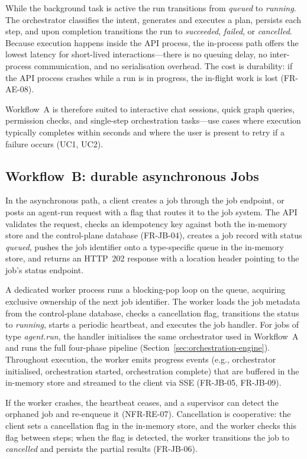 \documentclass[a4paper,noexaminfo]{sapthesis}
\begin{document}
While the background task is active the run transitions from
\emph{queued} to \emph{running}.  The orchestrator classifies the intent,
generates and executes a plan, persists each step, and upon completion
transitions the run to \emph{succeeded}, \emph{failed}, or \emph{cancelled}.
Because execution happens inside the API process, the in-process path
offers the lowest latency for short-lived interactions---there is no
queuing delay, no inter-process communication, and no serialisation
overhead.  The cost is durability: if the API process crashes while a run
is in progress, the in-flight work is lost (FR-AE-08).

Workflow~A is therefore suited to interactive chat sessions, quick graph
queries, permission checks, and single-step orchestration tasks---use cases
where execution typically completes within seconds and where the user is
present to retry if a failure occurs (UC1, UC2).

\subsection{Workflow~B: durable asynchronous Jobs}

In the asynchronous path, a client creates a job through the job endpoint,
or posts an agent-run request with a flag that routes it to the job system.
The API validates the request, checks an idempotency key against both the
in-memory store and the control-plane database (FR-JB-04), creates a job
record with status \emph{queued}, pushes the job identifier onto a type-specific
queue in the in-memory store, and returns an HTTP~202 response with a
location header pointing to the job's status endpoint.

A dedicated worker process runs a blocking-pop loop on the queue, acquiring
exclusive ownership of the next job identifier.  The worker loads the job
metadata from the control-plane database, checks a cancellation flag,
transitions the status to \emph{running}, starts a periodic heartbeat, and
executes the job handler.  For jobs of type \emph{agent.run}, the handler
initialises the same orchestrator used in Workflow~A and runs the full
four-phase pipeline (Section~\ref{sec:orchestration-engine}).  Throughout
execution, the worker emits progress events (e.g., orchestrator
initialised, orchestration started, orchestration complete) that are
buffered in the in-memory store and streamed to the client via SSE
(FR-JB-05, FR-JB-09).

If the worker crashes, the heartbeat ceases, and a supervisor can detect
the orphaned job and re-enqueue it (NFR-RE-07).  Cancellation is
cooperative: the client sets a cancellation flag in the in-memory store,
and the worker checks this flag between steps; when the flag is detected,
the worker transitions the job to \emph{cancelled} and persists the
partial results (FR-JB-06).
\end{document}
